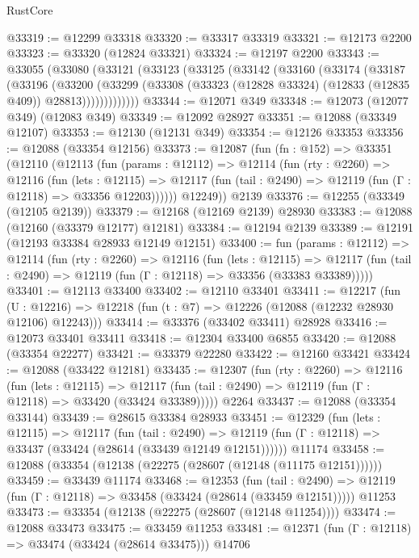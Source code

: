 \begin{lexlean}{RustCore}
\begin{coremodule}
@33319 := @12299 @33318
@33320 := @33317 @33319
@33321 := @12173 @2200
@33323 := @33320 (@12824 @33321)
@33324 := @12197 @2200
@33343 := @33055
    (@33080
      (@33121
        (@33123
          (@33125
            (@33142
              (@33160
                (@33174
                  (@33187
                    (@33196
                      (@33200
                        (@33299
                          (@33308 (@33323 (@12828 @33324) (@12833 (@12835 @409)) @28813)))))))))))))
@33344 := @12071 @349
@33348 := @12073 (@12077 @349) (@12083 @349)
@33349 := @12092 @28927
@33351 := @12088 (@33349 @12107)
@33353 := @12130 (@12131 @349)
@33354 := @12126 @33353
@33356 := @12088 (@33354 @12156)
@33373 := @12087
    (fun (fn : @152) =>
    @33351
      (@12110
        (@12113
          (fun (params : @12112) =>
          @12114
            (fun (rty : @2260) =>
            @12116
              (fun (lets : @12115) =>
              @12117 (fun (tail : @2490) => @12119 (fun (Γ : @12118) => @33356 @12203))))))
        @12249))
    @2139
@33376 := @12255 (@33349 (@12105 @2139))
@33379 := @12168 (@12169 @2139) @28930
@33383 := @12088 (@12160 (@33379 @12177) @12181)
@33384 := @12194 @2139
@33389 := @12191 (@12193 @33384 @28933 @12149 @12151)
@33400 := fun (params : @12112) =>
  @12114
    (fun (rty : @2260) =>
    @12116
      (fun (lets : @12115) =>
      @12117 (fun (tail : @2490) => @12119 (fun (Γ : @12118) => @33356 (@33383 @33389)))))
@33401 := @12113 @33400
@33402 := @12110 @33401
@33411 := @12217
    (fun (U : @12216) => @12218 (fun (t : @7) => @12226 (@12088 (@12232 @28930 @12106) @12243)))
@33414 := @33376 (@33402 @33411) @28928
@33416 := @12073 @33401 @33411
@33418 := @12304 @33400 @6855
@33420 := @12088 (@33354 @22277)
@33421 := @33379 @22280
@33422 := @12160 @33421
@33424 := @12088 (@33422 @12181)
@33435 := @12307
    (fun (rty : @2260) =>
    @12116
      (fun (lets : @12115) =>
      @12117 (fun (tail : @2490) => @12119 (fun (Γ : @12118) => @33420 (@33424 @33389)))))
    @2264
@33437 := @12088 (@33354 @33144)
@33439 := @28615 @33384 @28933
@33451 := @12329
    (fun (lets : @12115) =>
    @12117
      (fun (tail : @2490) =>
      @12119 (fun (Γ : @12118) => @33437 (@33424 (@28614 (@33439 @12149 @12151))))))
    @11174
@33458 := @12088 (@33354 (@12138 (@22275 (@28607 (@12148 (@11175 @12151))))))
@33459 := @33439 @11174
@33468 := @12353
    (fun (tail : @2490) => @12119 (fun (Γ : @12118) => @33458 (@33424 (@28614 (@33459 @12151)))))
    @11253
@33473 := @33354 (@12138 (@22275 (@28607 (@12148 @11254))))
@33474 := @12088 @33473
@33475 := @33459 @11253
@33481 := @12371 (fun (Γ : @12118) => @33474 (@33424 (@28614 @33475))) @14706

\end{coremodule}
\end{lexlean}
